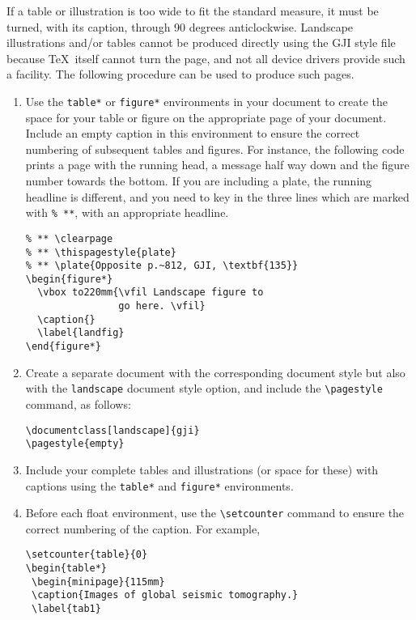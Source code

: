 \documentclass{gji}
\begin{document}
If a table or illustration is too wide to fit the standard measure, it
must be turned, with its caption, through 90 degrees anticlockwise.
Landscape illustrations and/or tables cannot be produced directly
using the GJI style file because \TeX\ itself cannot turn the
page, and not all device drivers provide such a facility.
The following procedure can be used to produce such pages.
\begin{enumerate}
  \item Use the \verb"table*" or \verb"figure*" environments in your
        document to create the space for your table or figure on the
        appropriate page of your document. Include an empty
        caption in this environment to ensure the correct
        numbering of subsequent tables and figures. For instance, the
        following code prints a page with the running head, a message
        half way down and the figure number towards the bottom. If you
        are including a plate, the running headline is different, and you
        need to key in the three lines which are marked with \verb"% **",
        with an appropriate headline.
\begin{verbatim}
% ** \clearpage
% ** \thispagestyle{plate}
% ** \plate{Opposite p.~812, GJI, \textbf{135}}
\begin{figure*}
  \vbox to220mm{\vfil Landscape figure to
                go here. \vfil}
  \caption{}
  \label{landfig}
\end{figure*}
\end{verbatim}
\item Create a separate document with the corresponding document style
      but also with the \verb"landscape" document style option, and
      include the \verb"\pagestyle" command, as follows:
\begin{verbatim}
\documentclass[landscape]{gji}
\pagestyle{empty}
\end{verbatim}
  \item Include your complete tables and illustrations (or space for
        these) with captions using the \verb"table*" and \verb"figure*"
        environments.
  \item Before each float environment, use the
        \verb"\setcounter" command to ensure the correct numbering of
        the caption. For example,
\begin{verbatim}
\setcounter{table}{0}
\begin{table*}
 \begin{minipage}{115mm}
 \caption{Images of global seismic tomography.}
 \label{tab1}

\end{verbatim}
\end{enumerate}
\end{document}
